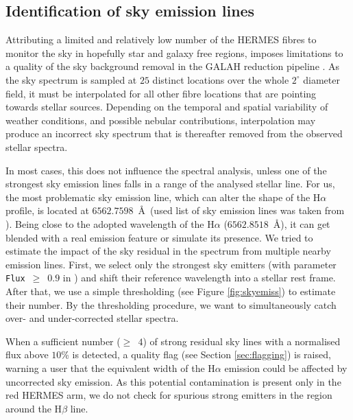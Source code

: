\subsection{Identification of sky emission lines}
\label{sec:skyemis}
Attributing a limited and relatively low number of the HERMES fibres to monitor the sky in hopefully star and galaxy free regions, imposes limitations to a quality of the sky background removal in the GALAH reduction pipeline \cite{2017MNRAS.464.1259K}. As the sky spectrum is sampled at $25$ distinct locations over the whole $2^\circ$ diameter field, it must be interpolated for all other fibre locations that are pointing towards stellar sources. Depending on the temporal and spatial variability of weather conditions, and possible nebular contributions, interpolation may produce an incorrect sky spectrum that is thereafter removed from the observed stellar spectra.

In most cases, this does not influence the spectral analysis, unless one of the strongest sky emission lines falls in a range of the analysed stellar line. For us, the most problematic sky emission line, which can alter the shape of the H$\alpha$ profile, is located at $6562.7598$~\AA\ (used list of sky emission lines was taken from \citet{2003A&A...407.1157H}). Being close to the adopted wavelength of the H$\alpha$ ($6562.8518$~\AA), it can get blended with a real emission feature or simulate its presence. We tried to estimate the impact of the sky residual in the spectrum from multiple nearby emission lines. First, we select only the strongest sky emitters (with parameter \texttt{Flux}~$\ge$~$0.9$ in \citet{2003A&A...407.1157H}) and shift their reference wavelength into a stellar rest frame. After that, we use a simple thresholding (see Figure \ref{fig:skyemiss}) to estimate their number. By the thresholding procedure, we want to simultaneously catch over- and under-corrected stellar spectra.

When a sufficient number ($\ge$~$4$) of strong residual sky lines with a normalised flux above $10$\% is detected, a quality flag (see Section \ref{sec:flagging}) is raised, warning a user that the equivalent width of the H$\alpha$ emission could be affected by uncorrected sky emission. As this potential contamination is present only in the red HERMES arm, we do not check for spurious strong emitters in the region around the H$\beta$ line.

